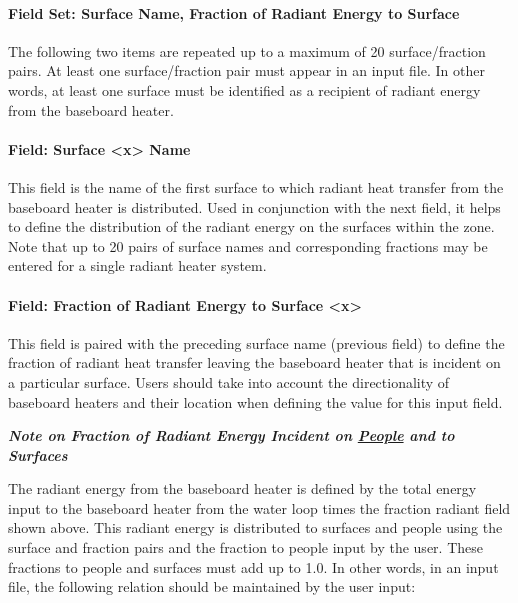 \paragraph{Field Set: Surface Name, Fraction of Radiant Energy to Surface}\label{field-set-surface-name-fraction-of-radiant-energy-to-surface}

The following two items are repeated up to a maximum of 20 surface/fraction pairs. At least one surface/fraction pair must appear in an input file. In other words, at least one surface must be identified as a recipient of radiant energy from the baseboard heater.

\paragraph{Field: Surface \textless{}x\textgreater{} Name}\label{field-surface-x-name}

This field is the name of the first surface to which radiant heat transfer from the baseboard heater is distributed. Used in conjunction with the next field, it helps to define the distribution of the radiant energy on the surfaces within the zone. Note that up to 20 pairs of surface names and corresponding fractions may be entered for a single radiant heater system.

\paragraph{Field: Fraction of Radiant Energy to Surface \textless{}x\textgreater{}}\label{field-fraction-of-radiant-energy-to-surface-x}

This field is paired with the preceding surface name (previous field) to define the fraction of radiant heat transfer leaving the baseboard heater that is incident on a particular surface. Users should take into account the directionality of baseboard heaters and their location when defining the value for this input field.

\textbf{\emph{Note on Fraction of Radiant Energy Incident on \hyperref[people]{People} and to Surfaces}}

The radiant energy from the baseboard heater is defined by the total energy input to the baseboard heater from the water loop times the fraction radiant field shown above. This radiant energy is distributed to surfaces and people using the surface and fraction pairs and the fraction to people input by the user. These fractions to people and surfaces must add up to 1.0. In other words, in an input file, the following relation should be maintained by the user input:

